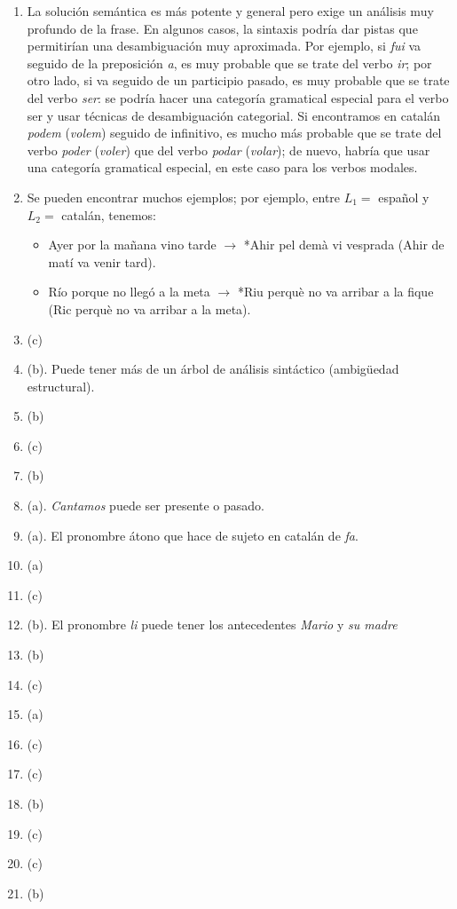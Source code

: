\begin{enumerate}
\item La solución semántica es más potente y general pero exige un análisis muy profundo de la frase. En algunos casos, la sintaxis podría dar pistas que permitirían una desambiguación muy aproximada. Por ejemplo, si {\em fui\/} va seguido de la preposición {\em a}, es muy probable que se trate del verbo {\em ir}; por otro lado, si va seguido de un participio pasado, es muy probable que se trate del verbo {\em ser\/}: se podría hacer una categoría gramatical especial para el verbo ser y usar técnicas de desambiguación categorial. Si encontramos en catalán {\em podem\/} ({\em volem\/}) seguido de infinitivo, es mucho más probable que se trate del verbo {\em poder\/} ({\em voler\/}) que del verbo {\em podar} ({\em volar\/}); de nuevo, habría que usar una categoría gramatical especial, en este caso para los verbos modales. 

\item Se pueden encontrar muchos ejemplos; por ejemplo, entre $L_1 =$ español y $L_2 =$ catalán, tenemos: \begin{itemize} \item Ayer por la mañana vino tarde $\rightarrow$ *Ahir pel demà vi vesprada (Ahir de matí va venir tard). \item Río porque no llegó a la meta $\rightarrow$ *Riu perquè no va arribar a la fique (Ric perquè no va arribar a la meta). \end{itemize} 

\item (c) \item (b). Puede tener más de un árbol de análisis sintáctico (ambigüedad estructural). \item (b) \item (c) \item (b) \item (a). \emph{Cantamos} puede ser presente o pasado. \item (a). El pronombre átono que hace de sujeto en catalán de \emph{fa}. \item (a) 

\item (c) \item (b). El pronombre \emph{li} puede tener los antecedentes \emph{Mario} y \emph{su madre} \item (b) \item (c) \item (a) \item (c) \item (c) \item (b) \item (c) \item (c) \item (b) \end{enumerate} 

